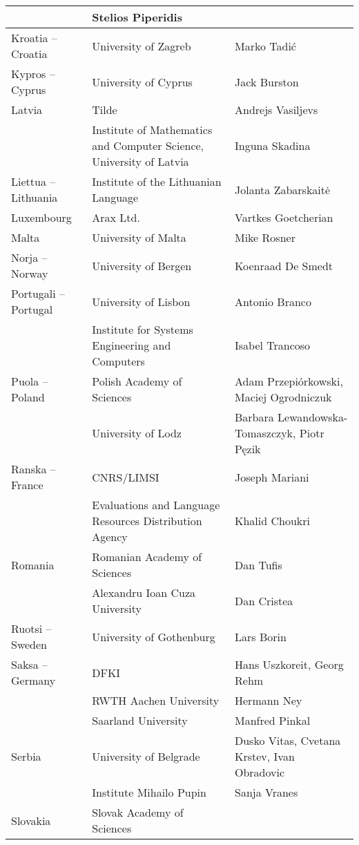 \documentclass[]{../../metanetpaper}
\begin{document}
\begin{Parallel}[c]{77mm}{77mm}
\begin{longtable}{p{3.5cm}|p{5.5cm}|p{5cm}}
 & Stelios Piperidis
 \\ \hline
 Kroatia -- Croatia
 &  University of Zagreb
 &  Marko Tadić
 \\ \hline
 Kypros -- Cyprus
 &  University of Cyprus
 &  Jack Burston
 \\ \hline
 Latvia
 &  Tilde
 &  Andrejs Vasiljevs
 \\
 &  Institute of Mathematics and      
    Computer Science, University of  
    Latvia
 &  Inguna Skadina
 \\ \hline
 Liettua -- Lithuania
 &  Institute of the Lithuanian       
    Language
 &  Jolanta Zabarskaitė
 \\ \hline
 Luxembourg
 &  Arax Ltd.
 &  Vartkes Goetcherian
 \\ \hline
 Malta
 &  University of Malta
 &  Mike Rosner
 \\ \hline
 Norja -- Norway
 &  University of Bergen
 &  Koenraad De Smedt
 \\ \hline
 Portugali -- Portugal
 &  University of Lisbon
 &  Antonio Branco
 \\
 &  Institute for Systems      
    Engineering and Computers
 &  Isabel Trancoso
 \\ \hline
 Puola -- Poland
 &  Polish Academy of Sciences
 &  Adam Przepiórkowski,
    Maciej Ogrodniczuk
 \\
 &  University of Lodz
 &  Barbara Lewandowska-Tomaszczyk,
    Piotr Pęzik
 \\ \hline
 Ranska -- France
 &  CNRS/LIMSI
 &  Joseph Mariani
 \\
 &  \raggedright Evaluations and Language
    Resources Distribution Agency
 &  Khalid Choukri \\ \hline
 Romania
 &  Romanian Academy of Sciences
 &  Dan Tufis
 \\
 &  Alexandru Ioan Cuza University
 &  Dan Cristea
 \\ \hline
 Ruotsi -- Sweden
 &  University of Gothenburg
 &  Lars Borin
 \\ \hline
 Saksa -- Germany
 &  DFKI
 &  Hans Uszkoreit, Georg Rehm
 \\
 & RWTH Aachen University
 & Hermann Ney
 \\
 & Saarland University
 & Manfred Pinkal
 \\ \hline
 Serbia
 &  University of Belgrade
 &  Dusko Vitas,
    Cvetana Krstev,
    Ivan Obradovic
 \\
 &  Institute Mihailo Pupin
 &  Sanja Vranes
 \\ \hline
 Slovakia 
 &  Slovak Academy of Sciences

\end{longtable}
\end{Parallel}
\end{document}
